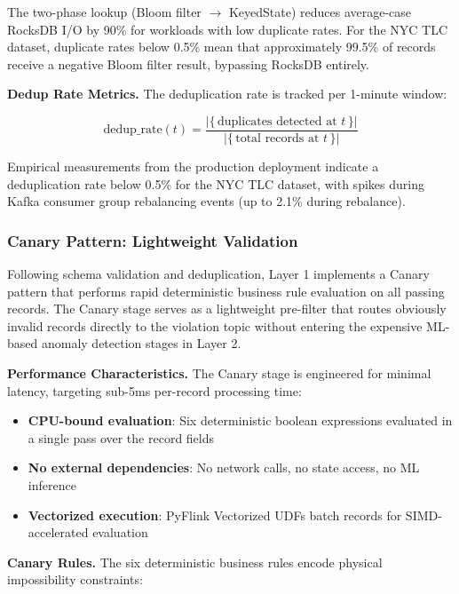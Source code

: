 The two-phase lookup (Bloom filter $\rightarrow$ KeyedState) reduces average-case RocksDB I/O by 90\% for workloads with low duplicate rates. For the NYC TLC dataset, duplicate rates below 0.5\% mean that approximately 99.5\% of records receive a negative Bloom filter result, bypassing RocksDB entirely.

\textbf{Dedup Rate Metrics.} The deduplication rate is tracked per 1-minute window:

\begin{equation}
\text{dedup\_rate}(t) = \frac{|\{\,\text{duplicates detected at }t\,\}|}{|\{\,\text{total records at }t\,\}|}
\label{eq:dedup_rate}
\end{equation}

Empirical measurements from the production deployment indicate a deduplication rate below 0.5\% for the NYC TLC dataset, with spikes during Kafka consumer group rebalancing events (up to 2.1\% during rebalance).

\subsubsection{Canary Pattern: Lightweight Validation}

Following schema validation and deduplication, Layer 1 implements a Canary pattern that performs rapid deterministic business rule evaluation on all passing records. The Canary stage serves as a lightweight pre-filter that routes obviously invalid records directly to the violation topic without entering the expensive ML-based anomaly detection stages in Layer 2.

\textbf{Performance Characteristics.} The Canary stage is engineered for minimal latency, targeting sub-5ms per-record processing time:

\begin{itemize}
    \item \textbf{CPU-bound evaluation}: Six deterministic boolean expressions evaluated in a single pass over the record fields
    \item \textbf{No external dependencies}: No network calls, no state access, no ML inference
    \item \textbf{Vectorized execution}: PyFlink Vectorized UDFs batch records for SIMD-accelerated evaluation
\end{itemize}

\textbf{Canary Rules.} The six deterministic business rules encode physical impossibility constraints:

